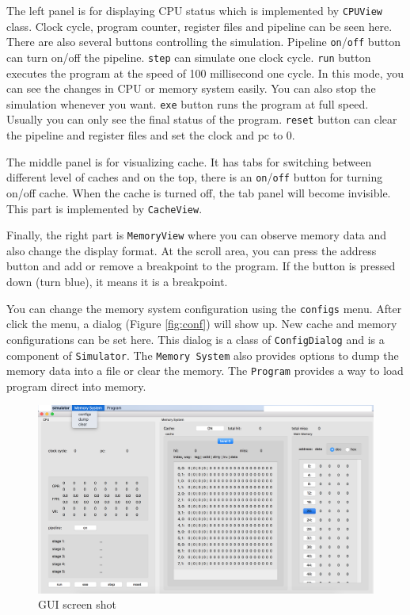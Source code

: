 \documentclass{sig-alternate}
\begin{document}
The left panel is for displaying CPU status which is implemented by \texttt{CPUView} class. Clock cycle, program counter, register files and pipeline can be seen here. There are also several buttons controlling the simulation. Pipeline \texttt{on}/\texttt{off} button can turn on/off the pipeline. \texttt{step} can simulate one clock cycle. \texttt{run} button executes the program at the speed of 100 millisecond one cycle. In this mode, you can see the changes in CPU or memory system easily. You can also stop the simulation whenever you want. \texttt{exe} button runs the program at full speed. Usually you can only see the final status of the program. \texttt{reset} button can clear the pipeline and register files and set the clock and pc to 0. 

The middle panel is for visualizing cache. It has tabs for switching between different level of caches and on the top, there is an \texttt{on}/\texttt{off} button for turning on/off cache. When the cache is turned off, the tab panel will become invisible. This part is implemented by \texttt{CacheView}. 

Finally, the right part is \texttt{MemoryView} where you can observe memory data and also change the display format. At the scroll area, you can press the address button and add or remove a breakpoint to the program. If the button is pressed down (turn blue), it means it is a breakpoint. 

You can change the memory system configuration using the \texttt{configs} menu. After click the menu, a dialog (Figure \ref{fig:conf}) will show up. New cache and memory configurations can be set here. This dialog is a class of \texttt{ConfigDialog} and is a component of \texttt{Simulator}. The \texttt{Memory System} also provides options to dump the memory data into a file or clear the memory. The \texttt{Program} provides a way to load program direct into memory. 

\begin{figure}
\centering
\includegraphics[width = 0.8\linewidth,keepaspectratio]{gui}
\caption{GUI screen shot}
\label{fig:gui}
\end{figure}
\end{document}
